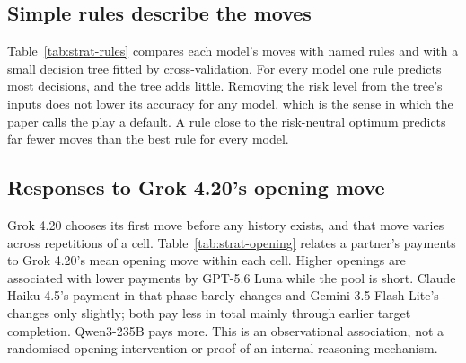 \documentclass[10pt]{article}
\let\plainsubsection\subsection
\renewcommand{\subsection}{\FloatBarrier\needspace{8\baselineskip}\plainsubsection}
\begin{document}
\begin{table}[h]
\caption{Self-play games on the risk grid whose expected payoff per seat is below that of the worst Nash equilibrium.}
\label{tab:strat-equilibrium}
\centering\small

\end{table}

\subsection{Simple rules describe the moves}

Table~\ref{tab:strat-rules} compares each model's moves with named rules and with a small decision tree fitted by cross-validation. For every model one rule predicts most decisions, and the tree adds little. Removing the risk level from the tree's inputs does not lower its accuracy for any model, which is the sense in which the paper calls the play a default. A rule close to the risk-neutral optimum predicts far fewer moves than the best rule for every model.

\begin{table}[h]
\caption{How well named rules and a fitted tree predict each model's moves.}
\label{tab:strat-rules}
\centering\small

\end{table}

\subsection{Responses to Grok 4.20's opening move}

Grok 4.20 chooses its first move before any history exists, and that move varies across repetitions of a cell. Table~\ref{tab:strat-opening} relates a partner's payments to Grok 4.20's mean opening move within each cell. Higher openings are associated with lower payments by GPT-5.6 Luna while the pool is short. Claude Haiku 4.5's payment in that phase barely changes and Gemini 3.5 Flash-Lite's changes only slightly; both pay less in total mainly through earlier target completion. Qwen3-235B pays more. This is an observational association, not a randomised opening intervention or proof of an internal reasoning mechanism.

\begin{table}[h]
\caption{Change in a partner seat's payment per unit of Grok 4.20's mean opening move, within cells of the two-model tables, with 95\% bootstrap intervals over games.}
\label{tab:strat-opening}
\centering\small

\end{table}
\end{document}
